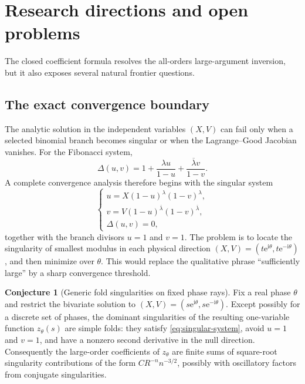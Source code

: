\documentclass[11pt,oneside]{article}
\theoremstyle{plain}
\theoremstyle{definition}
\newtheorem{conjecture}[theorem]{Conjecture}
\theoremstyle{remark}
\newcommand{\e}{\mathrm{e}}
\newcommand{\ii}{\mathrm{i}}
\begin{document}
\section{Research directions and open problems}
\label{sec:future}

The closed coefficient formula resolves the all-orders large-argument
inversion, but it also exposes several natural frontier questions.

\subsection{The exact convergence boundary}

The analytic solution in the independent variables \((X,V)\) can fail only
when a selected binomial branch becomes singular or when the Lagrange--Good
Jacobian vanishes.  For the Fibonacci system,
\begin{equation}
 \Delta(u,v)=1+\frac{\lambda u}{1-u}
                +\frac{\overline\lambda v}{1-v}.
 \label{eq:F-Delta-explicit}
\end{equation}
A complete convergence analysis therefore begins with the singular system
\begin{equation}
 \begin{cases}
 u=X(1-u)^\lambda(1-v)^\lambda,\\
 v=V(1-u)^{\overline\lambda}(1-v)^{\overline\lambda},\\
 \Delta(u,v)=0,
 \end{cases}
 \label{eq:singular-system}
\end{equation}
together with the branch divisors \(u=1\) and \(v=1\).  The problem is to
locate the singularity of smallest modulus in each physical direction
\((X,V)=(t\e^{\ii\theta},t\e^{-\ii\theta})\), and then minimize over
\(\theta\).  This would replace the qualitative phrase ``sufficiently large''
by a sharp convergence threshold.

\begin{conjecture}[Generic fold singularities on fixed phase rays]
\label{conj:generic-fold}
Fix a real phase \(\theta\) and restrict the bivariate solution to
\((X,V)=(s\e^{\ii\theta},s\e^{-\ii\theta})\).  Except possibly for a discrete
set of phases, the dominant singularities of the resulting one-variable
function \(z_\theta(s)\) are simple folds: they satisfy
\eqref{eq:singular-system}, avoid \(u=1\) and \(v=1\), and have a nonzero
second derivative in the null direction.  Consequently the large-order
coefficients of \(z_\theta\) are finite sums of square-root singularity
contributions of the form
\(C R^{-n}n^{-3/2}\), possibly with oscillatory factors from conjugate
singularities.
\end{conjecture}
\end{document}
